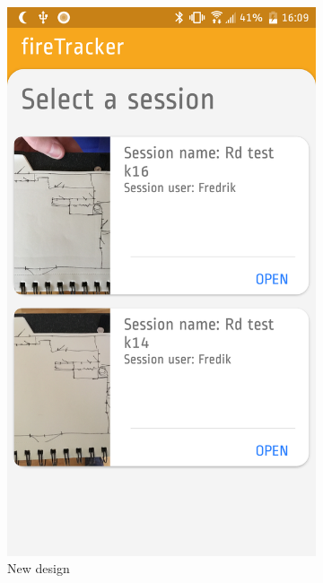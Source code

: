 \documentclass[../Main/thesis.tex]{subfiles}
\begin{document}
\begin{figure}[h]
\begin{subfigure}{0.23\textwidth}
		\includegraphics[width=\textwidth]{../fig/firetracker_app_new_1}
		\caption{New design}
		\label{fig:app-new-design-sessionlist-iteration3}
	\end{subfigure}
	\begin{subfigure}{0.23\textwidth}

\end{subfigure}
\end{figure}
\end{document}
